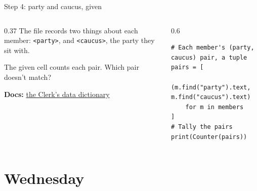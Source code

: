 \documentclass[9pt,aspectratio=169]{beamer}
\begin{document}
\begin{frame}[fragile]{Step 4: party and caucus, given}
    \begin{columns}[T]
        \begin{column}{0.37\textwidth}
            The file records two things about each member: \texttt{<party>}, and \texttt{<caucus>}, the party they sit with.

            \medskip
            The given cell counts each pair. Which pair doesn't match?

            \medskip
            {\scriptsize\textbf{Docs:} \href{https://clerk.house.gov/member_info/MemberData_UserGuide.pdf}{the Clerk's data dictionary}\par}
        \end{column}
        \begin{column}{0.6\textwidth}
\begin{lstlisting}
# Each member's (party, caucus) pair, a tuple
pairs = [
    (m.find("party").text, m.find("caucus").text)
    for m in members
]
# Tally the pairs
print(Counter(pairs))
\end{lstlisting}
        \end{column}
    \end{columns}
\end{frame}

\section{Wednesday}
\end{document}
